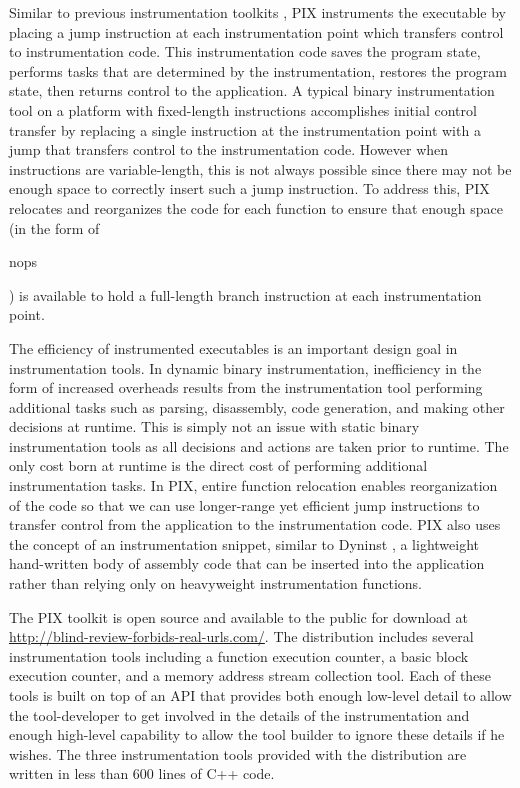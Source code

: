 Similar to previous instrumentation toolkits \cite{buck2000api}, PIX instruments the executable 
by placing a jump instruction at each instrumentation
point which transfers control to instrumentation code. This instrumentation code saves the
program state, performs tasks that are determined by the instrumentation,
restores the program state, then returns control to the application.
A typical binary instrumentation tool on a platform with fixed-length instructions 
\cite{tikir2006pmac} accomplishes initial control transfer by replacing a
single instruction at the instrumentation point with a jump that transfers
control to the instrumentation code. However when instructions are variable-length,
this is not always possible since there may not be enough space to correctly 
insert such a jump instruction. To address this, PIX
relocates and reorganizes the code for each function to ensure that enough
space (in the form of \begin{it}nops\end{it}) is available to hold a full-length branch instruction at each
instrumentation point.

The efficiency of instrumented executables is an important design goal in instrumentation tools. In dynamic binary instrumentation,
inefficiency in the form of increased overheads results from the instrumentation tool performing additional tasks such 
as parsing, disassembly, code generation, and making other decisions at runtime. This
is simply not an issue with static binary instrumentation tools as all
decisions and actions are taken prior to runtime. The only cost born at runtime is the direct
cost of performing additional instrumentation tasks. In PIX, entire function relocation
enables reorganization of the code so that we
can use longer-range yet efficient jump instructions to transfer control from the
application to the instrumentation code. PIX also uses the concept of an
instrumentation snippet, similar to Dyninst \cite{buck2000api}, a lightweight hand-written body of assembly code that can
be inserted into the application rather than relying only on heavyweight
instrumentation functions.

The PIX toolkit is open source and available to the public for download 
at \url{http://blind-review-forbids-real-urls.com/}. The distribution includes several instrumentation tools 
including a function execution counter, a basic block
execution counter, and a memory address stream collection tool. Each of these tools is built on top of
an API that provides both enough low-level detail to allow the tool-developer to get involved in the 
details of the instrumentation and enough high-level capability to allow the tool builder
to ignore these details if he wishes. The three instrumentation tools provided with the distribution are written in
less than 600 lines of C++ code.


